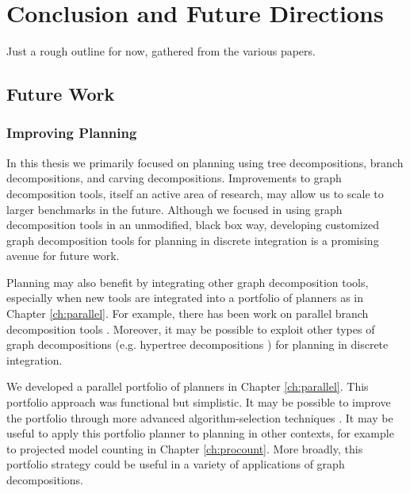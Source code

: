 \chapter{Conclusion and Future Directions}
\label{ch:conclusion}
Just a rough outline for now, gathered from the various papers.

\section{Future Work}



\subsection{Improving Planning}
In this thesis we primarily focused on planning using tree decompositions, branch decompositions, and carving decompositions. 
Improvements to graph decomposition tools, itself an active area of research, may allow us to scale to larger benchmarks in the future.
Although we focused in using graph decomposition tools in an unmodified, black box way, developing customized graph decomposition tools for planning in discrete integration is a promising avenue for future work.

Planning may also benefit by integrating other graph decomposition tools, especially when new tools are integrated into a portfolio of planners as in Chapter \ref{ch:parallel}. 
For example, there has been work on parallel branch decomposition tools \cite{hicks2000branch}.
Moreover, it may be possible to exploit other types of graph decompositions (e.g. hypertree decompositions \cite{AGG07}) for planning in discrete integration.

We developed a parallel portfolio of planners in Chapter \ref{ch:parallel}. 
This portfolio approach was functional but simplistic.
It may be possible to improve the portfolio through more advanced algorithm-selection techniques \cite{HHLKS09,XHHL12}. 
It may be useful to apply this portfolio planner to planning in other contexts, for example to projected model counting in Chapter \ref{ch:procount}.
More broadly, this portfolio strategy could be useful in a variety of applications of graph decompositions.


